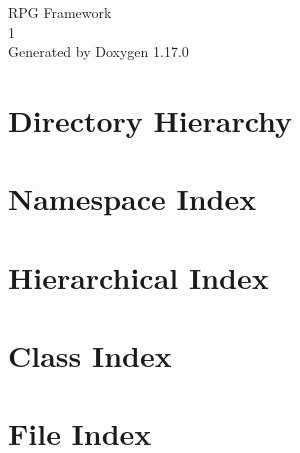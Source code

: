 \documentclass[twoside]{book}
\newcommand{\+}{\discretionary{\mbox{\scriptsize$\hookleftarrow$}}{}{}}
\newcommand{\clearemptydoublepage}{%
    \newpage{\pagestyle{empty}\cleardoublepage}%
  }
\begin{document}
  \raggedbottom
    \hypersetup{pageanchor=false,
                bookmarksnumbered=true,
                pdfencoding=unicode
               }
  \begin{titlepage}
  \vspace*{7cm}
  \begin{center}%
  {\Large RPG Framework}\\
  [1ex]\large 1 \\
  \vspace*{1cm}
  {\large Generated by Doxygen 1.17.0}\\
  \end{center}
  \end{titlepage}
  \clearemptydoublepage
  \tableofcontents
  \clearemptydoublepage
  \hypersetup{pageanchor=true}


\chapter{Directory Hierarchy}

\chapter{Namespace Index}

\chapter{Hierarchical Index}

\chapter{Class Index}

\chapter{File Index}

\end{document}
